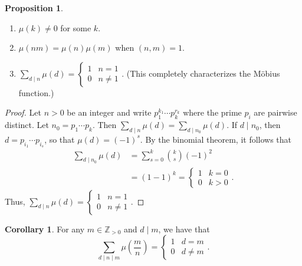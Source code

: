 \documentclass[10pt,letterpaper,cm]{nupset}
\theoremstyle{definition}
\theoremstyle{theorem}
\newtheorem{prop}[definition]{Proposition}
\newtheorem{corollary}[definition]{Corollary}
\theoremstyle{remark}
\newcommand{\Z}{\mathbb Z}
\newcommand{\1}{\mathbf{1}}
\newcommand{\0}{\vec 0}
\begin{document}
\begin{prop} $ $
\begin{enumerate}
\item $\mu(k) \ne 0$ for some $k$.
\item $\mu(nm) = \mu(n) \mu(m)$ when $(n,m) = 1$.
\item $\sum_{d\mid n}\mu(d) = \begin{cases} 1 & n=1 \\ 0 & n \ne 1 \end{cases}.$ (This completely characterizes the M\"{o}bius function.)
\end{enumerate}
\end{prop}
\begin{proof} Let $n>0$ be an integer and write $p_1^{k_1}\cdots p_k^{r_k}$ where the prime $p_i$ are pairwise distinct. Let $n_0 = p_1\cdots p_k$. Then $\sum_{d\mid n}\mu(d) =\sum_{d\mid n_0} \mu(d)$. If $d\mid n_0$, then $d= p_{i_1}\cdots p_{i_s}$, so that $\mu(d) = ({-1})^s$. By the binomial theorem, it follows that \begin{align*} \sum_{d\mid n_0}\mu(d) & = \sum_{s=0}^k {k\choose s}({-1})^2\\ & = (1-1)^k=\begin{cases} 1 & k=0 \\ 0 & k>0 \end{cases}  . \end{align*}
Thus, $\sum_{d\mid n}\mu(d) = \begin{cases} 1 & n=1 \\ 0 & n \ne 1 \end{cases}.$
\end{proof}


\begin{corollary}
For any $m\in \Z_{>0}$ and $d\mid m$, we have that $$\sum_{d\mid n \mid m}\mu \left(\frac{m}{n} \right) = \begin{cases}  1 & d = m \\ 0 & d\ne m\end{cases}.$$
\end{corollary}
\end{document}
